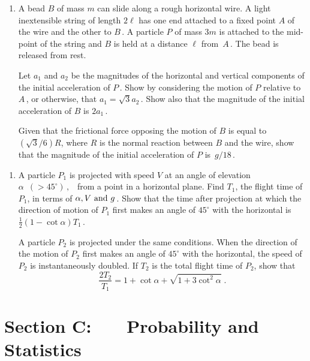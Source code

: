 \documentclass[a4, 11pt]{report}
\newlength{\qspace}
\newcounter{qnumber}
\newenvironment{question}%
 {\vspace{\qspace}
  \begin{enumerate}[\bfseries 1\quad][10]%
    \setcounter{enumi}{\value{qnumber}}%
    \item%
 }
{
  \end{enumerate}
  \filbreak
  \stepcounter{qnumber}
 }
\begin{document}
\begin{question}	
A bead $B$ of mass $m$ can slide along a rough horizontal wire.
A light inextensible string of length $2\ell$ has one end attached 
to a fixed point $A$
of the wire and the other to $B\,$. 
A particle $P$ of mass $3m$ is attached to the mid-point of the string
and $B$ is held at a distance
$\ell$ from~$A\,$. The bead is released from rest.


Let $a_1$ and $a_2$ be the magnitudes of the horizontal and vertical components of the
initial acceleration of $P\,$. Show by considering the motion of $P$ relative to $A\,$, or 
otherwise, that $a_1= \sqrt 3 a_2\,$. Show also that the magnitude
of the initial acceleration of $B$ is 
$2a_1\,$.

Given that the frictional force opposing the motion
of $B$ is equal to $({\sqrt{3}}/6)R$, where $R$ is the normal reaction 
between $B$ and the wire, show that the magnitude of the initial acceleration of 
$P$ is~$g/18\,$.
\end{question}


\begin{question}
A particle $P_1$ is projected with speed $V$ at an angle of elevation
${\alpha}\,\,\,( > 45^{\circ})\,,\,\,\,$ 
from a point in a horizontal plane. 
Find $T_1$, the flight time of $P_1$, in terms of
${\alpha}, V \hbox{    and    } g\,$.
Show that the time after projection at 
which the direction of motion of $P_1$ first 
makes an angle of 
$45^{\circ}$ with the horizontal is $\frac12 (1-\cot \alpha)T_1\,$.


A particle $P_2$  is projected 
under the same conditions.
When the direction of the motion of $P_2$ 
first makes an angle of  $45^{\circ}$ with the horizontal, the speed of
$P_2$ is instantaneously doubled. If $T_2$ is the total flight time of
$P_2$,  show that 
$$
\frac{2T_2}{T_1}
=  1+\cot{\alpha}
+\sqrt{1+3\cot^2{\alpha}} \;.
$$ 
\end{question}
	

	
	\newpage
\section*{Section C: \ \ \ Probability and Statistics}
\end{document}
